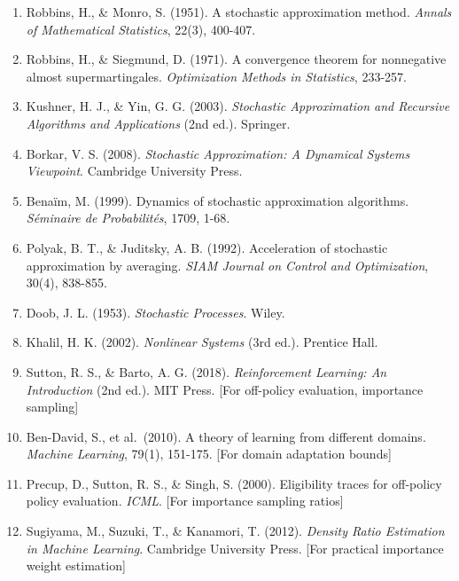 \documentclass[
  12pt,
]{ctexart}
\providecommand{\tightlist}{%
  \setlength{\itemsep}{0pt}\setlength{\parskip}{0pt}}
\begin{document}
\begin{enumerate}
\def\labelenumi{\arabic{enumi}.}
\tightlist
\item
  Robbins, H., \& Monro, S. (1951). A stochastic approximation method.
  \emph{Annals of Mathematical Statistics}, 22(3), 400-407.
\item
  Robbins, H., \& Siegmund, D. (1971). A convergence theorem for
  nonnegative almost supermartingales. \emph{Optimization Methods in
  Statistics}, 233-257.
\item
  Kushner, H. J., \& Yin, G. G. (2003). \emph{Stochastic Approximation
  and Recursive Algorithms and Applications} (2nd ed.). Springer.
\item
  Borkar, V. S. (2008). \emph{Stochastic Approximation: A Dynamical
  Systems Viewpoint}. Cambridge University Press.
\item
  Benaïm, M. (1999). Dynamics of stochastic approximation algorithms.
  \emph{Séminaire de Probabilités}, 1709, 1-68.
\item
  Polyak, B. T., \& Juditsky, A. B. (1992). Acceleration of stochastic
  approximation by averaging. \emph{SIAM Journal on Control and
  Optimization}, 30(4), 838-855.
\item
  Doob, J. L. (1953). \emph{Stochastic Processes}. Wiley.
\item
  Khalil, H. K. (2002). \emph{Nonlinear Systems} (3rd ed.). Prentice
  Hall.
\item
  Sutton, R. S., \& Barto, A. G. (2018). \emph{Reinforcement Learning:
  An Introduction} (2nd ed.). MIT Press. {[}For off-policy evaluation,
  importance sampling{]}
\item
  Ben-David, S., et al.~(2010). A theory of learning from different
  domains. \emph{Machine Learning}, 79(1), 151-175. {[}For domain
  adaptation bounds{]}
\item
  Precup, D., Sutton, R. S., \& Singh, S. (2000). Eligibility traces for
  off-policy policy evaluation. \emph{ICML}. {[}For importance sampling
  ratios{]}
\item
  Sugiyama, M., Suzuki, T., \& Kanamori, T. (2012). \emph{Density Ratio
  Estimation in Machine Learning}. Cambridge University Press. {[}For
  practical importance weight estimation{]}
\end{enumerate}
\end{document}
